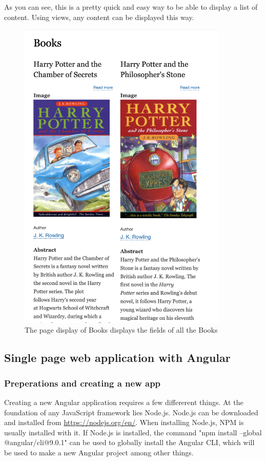 As you can see, this is a pretty quick and easy way to be able to display a list of content. Using views, any content can be displayed this way.

\begin{figure}[h]
	\centering
	\includegraphics[width=10cm]{./img/Books_Page.png}
	\caption[Display of a list of Books]{The page display of Books displays the fields of all the Books}
	\label{fig:Books}
\end{figure}

\subsection{Single page web application with Angular}

\subsubsection{Preperations and creating a new app}

Creating a new Angular application requires a few differerent things. At the foundation of any JavaScript framework lies \gls{Node.js}. Node.js can be downloaded and installed from \url{https://nodejs.org/en/}. When installing Node.js, \gls{NPM} is usually installed with it. If Node.js is installed, the command "npm install --global @angular/cli@9.0.1" can be used to globally install the Angular CLI, which will be used to make a new Angular project among other things.


